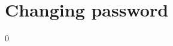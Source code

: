 \chapter{Changing password}
\hypertarget{md_setup_2README}{}\label{md_setup_2README}
\label{md_setup_2README_autotoc_md7}%
%

\begin{DoxyCode}{0}

\end{DoxyCode}
 